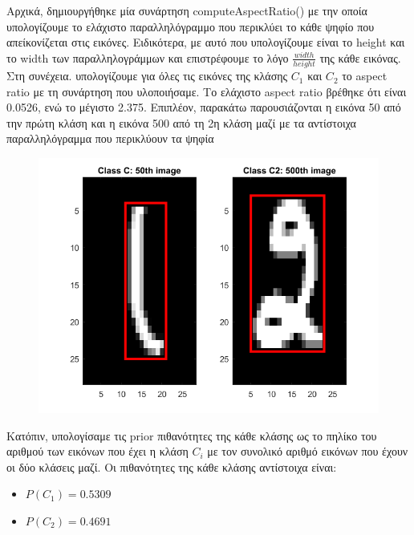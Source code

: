 \documentclass{article}
\begin{document}
	\noindent
	Αρχικά, δημιουργήθηκε μία συνάρτηση computeAspectRatio() με την οποία υπολογίζουμε το ελάχιστο παραλληλόγραμμο που περικλύει το κάθε ψηφίο που απείκονίζεται στις εικόνες. Ειδικότερα, με αυτό που υπολογίζουμε είναι το height και το width των παραλληλογράμμων και επιστρέφουμε το λόγο $\frac{width}{height}$ της κάθε εικόνας.\\
	
	\noindent
	Στη συνέχεια. υπολογίζουμε για όλες τις εικόνες της κλάσης $C_{1}$ και $C_{2}$ το aspect ratio με τη συνάρτηση που υλοποιήσαμε. Το ελάχιστο aspect ratio βρέθηκε ότι είναι 0.0526, ενώ το μέγιστο 2.375. Eπιπλέον, παρακάτω παρουσιάζονται η εικόνα 50 από την πρώτη κλάση και η εικόνα 500 από τη 2η κλάση μαζί με τα αντίστοιχα παραλληλόγραμμα που περικλύουν τα ψηφία
	
	\begin{figure}[h!]
		\centering
		\includegraphics[width=\linewidth]{../exercise1_5/images/c1_c2_digits.png}
	\end{figure}

	\noindent
	Kατόπιν, υπολογίσαμε τις prior πιθανότητες της κάθε κλάσης ως το πηλίκο του αριθμού των εικόνων που έχει η κλάση $C_{i}$ με τον συνολικό αριθμό εικόνων που έχουν οι δύο κλάσεις μαζί. Οι πιθανότητες της κάθε κλάσης αντίστοιχα είναι:

	\begin{itemize}
		\item $P(C_{1}) = 0.5309$ \\ 
		\item $P(C_{2}) = 0.4691$
	\end{itemize}
	
\end{document}
